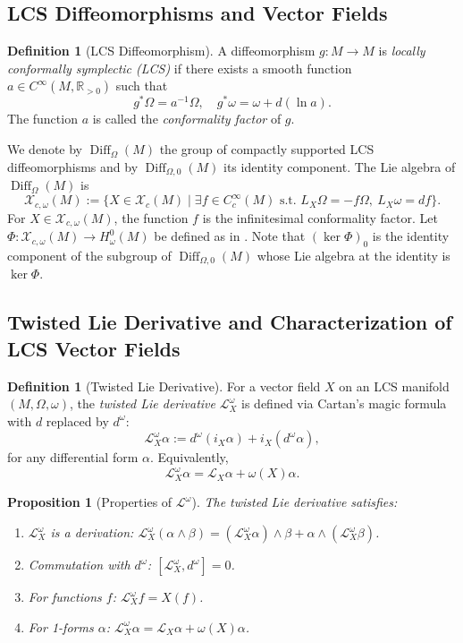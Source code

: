 \documentclass[11pt,a4paper]{amsart}
\newtheorem{proposition}[theorem]{Proposition}
\theoremstyle{definition}
\newtheorem{definition}[theorem]{Definition}
\theoremstyle{remark}
\newcommand{\Diff}{\operatorname{Diff}}
\newcommand{\Lomega}{\mathcal{L}^\omega}
\newcommand{\domega}{d^\omega}
\begin{document}
	\subsection{LCS Diffeomorphisms and Vector Fields}
	
	\begin{definition}[LCS Diffeomorphism]
		A diffeomorphism $g : M \to M$ is \emph{locally conformally symplectic (LCS)} if there exists a smooth function $a \in C^\infty(M, \mathbb{R}_{>0})$ such that
		\[
		g^*\Omega = a^{-1}\Omega, \quad g^*\omega = \omega + d(\ln a).
		\]
		The function $a$ is called the \emph{conformality factor} of $g$.
	\end{definition}
	
	We denote by $\Diff_\Omega(M)$ the group of compactly supported LCS diffeomorphisms and by $\Diff_{\Omega,0}(M)$ its identity component. The Lie algebra of $\Diff_\Omega(M)$ is
	\[
	\mathcal{X}_{c,\omega}(M) := \{ X \in \mathcal{X}_c(M) \mid \exists f \in C^\infty_c(M) \text{ s.t. } L_X\Omega = -f\Omega, \ L_X\omega = df \}.
	\]
	For $X \in \mathcal{X}_{c,\omega}(M)$, the function $f$ is the infinitesimal conformality factor. Let $\Phi : \mathcal{X}_{c,\omega}(M) \to H_\omega^0(M)$ be defined as in \cite{Haller2005}. Note that $(\ker \Phi)_0$ is the identity component of the subgroup of $\Diff_{\Omega,0}(M)$ whose Lie algebra at the identity is $\ker \Phi$.
	
	\subsection{Twisted Lie Derivative and Characterization of LCS Vector Fields}
	
	\begin{definition}[Twisted Lie Derivative]
		For a vector field $X$ on an LCS manifold $(M, \Omega, \omega)$, the \emph{twisted Lie derivative} $\Lomega_X$ is defined via Cartan's magic formula with $d$ replaced by $\domega$:
		\[
		\Lomega_X \alpha := \domega(i_X \alpha) + i_X(\domega \alpha),
		\]
		for any differential form $\alpha$. Equivalently,
		\[
		\Lomega_X \alpha = \mathcal{L}_X \alpha + \omega(X)\alpha.
		\]
	\end{definition}
	
	\begin{proposition}[Properties of $\Lomega$]
		The twisted Lie derivative satisfies:
		\begin{enumerate}
			\item $\Lomega_X$ is a derivation: $\Lomega_X(\alpha \wedge \beta) = (\Lomega_X \alpha) \wedge \beta + \alpha \wedge (\Lomega_X \beta)$.
			\item Commutation with $\domega$: $[\Lomega_X, \domega] = 0$.
			\item For functions $f$: $\Lomega_X f = X(f)$.
			\item For 1-forms $\alpha$: $\Lomega_X \alpha = \mathcal{L}_X \alpha + \omega(X)\alpha$.
		\end{enumerate}
	\end{proposition}
	
\end{document}
